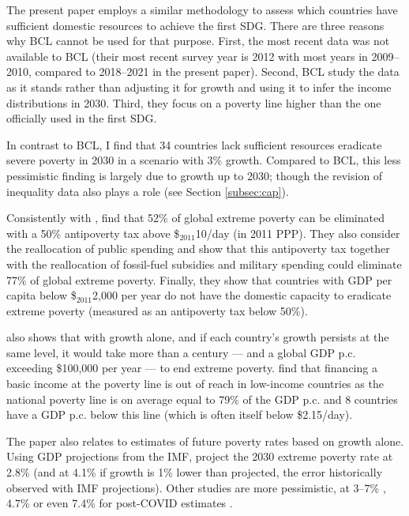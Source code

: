 \documentclass[12pt,english]{article}
\begin{document}
The present paper employs a similar methodology to assess which countries have sufficient domestic resources to achieve the first SDG. There are three reasons why BCL cannot be used %
for that purpose. 
First, the most recent data was not available to BCL (their most recent survey year is 2012 with most years in 2009--2010, compared to 2018--2021 in the present paper). %
Second, BCL study the data as it stands rather than adjusting it for growth and using it to infer the income distributions in 2030. Third, they focus on a poverty line higher than the one officially used in the first SDG.

In contrast to BCL, I find that 34 countries lack sufficient resources eradicate severe poverty in 2030 in a scenario with 3\% growth. Compared to BCL, this less pessimistic finding is largely due to growth up to 2030; though the revision of inequality data also plays a role (see Section \ref{subsec:cap}). 

Consistently with \cite{ravallion_poorer_2010}, \cite{hoy_gasoline_2016} find that 52\% of global extreme poverty can be eliminated with a 50\% antipoverty tax above \$$_\text{2011}$10/day (in 2011 PPP). They also consider the reallocation of public spending and show that this antipoverty tax together with the reallocation of fossil-fuel subsidies and military spending could eliminate 77\% of global extreme poverty. Finally, they show that countries with GDP per capita below \$$_\text{2011}$2,000 per year do not have the domestic capacity to eradicate extreme poverty (measured as an antipoverty tax below 50\%).

\cite{woodward_incrementum_2015} also shows that with growth alone, and if each country's growth persists at the same level, it would take more than a century --- and a global GDP p.c. exceeding \$100,000 per year --- to end extreme poverty. %
\cite{ortiz_universal_2018} find that financing a basic income at the poverty line is out of reach in low-income countries as the national poverty line is on average equal to 79\% of the GDP p.c. and 8 countries have a GDP p.c. below this line (which is often itself below \$2.15/day).

The paper also relates to estimates of future poverty rates based on growth alone. Using GDP projections from the IMF, \cite{karver_mdgs_2012} project the 2030 extreme poverty rate at 2.8\% (and at 4.1\% if growth is 1\% lower than projected, the error historically observed with IMF projections). Other studies are more pessimistic, at 3--7\% \citep{chandy_final_2013,bicaba_can_2017}, 4.7\% \citep{manuel_financing_2018} or even 7.4\% for post-COVID estimates \citep{lakner_how_2022}. 
\end{document}
